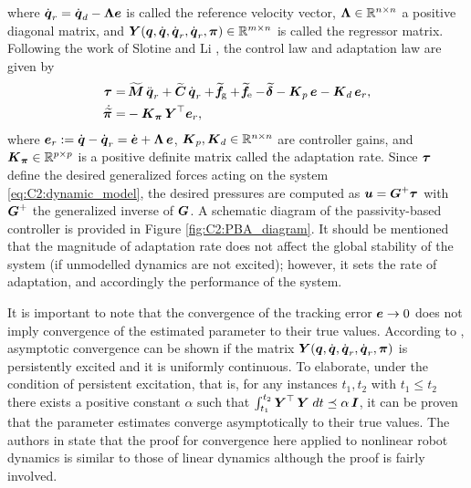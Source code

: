 \noindent where ${\dot{\boldsymbol{q}}}_r = {\dot{\boldsymbol{q}}}_d - \boldsymbol{\Lambda} {\boldsymbol{e}} $ is called the reference velocity vector, $\boldsymbol{\Lambda} \in \mathbb{R}^{n \times n}$ a positive diagonal matrix, and $\boldsymbol{Y}({\boldsymbol{q}},{\dot{\boldsymbol{q}}},{\dot{\boldsymbol{q}}}_r,{\dot{\boldsymbol{q}}}_r,\boldsymbol{\pi}) \in \mathbb{R}^{m\times n}$ is called the regressor matrix. Following the work of Slotine and Li \cite{Slotine1988}, the control law and adaptation law are given by
%
\begin{align}
\boldsymbol{\tau} = &\, \widetilde{\boldsymbol{M}}\,{\ddot{\boldsymbol{q}}}_r + \widetilde{\boldsymbol{C}}\, {\dot{\boldsymbol{q}}}_r + \widetilde{\!\boldsymbol{f}}\!_{\scriptstyle\textrm{g}} +  \widetilde{\!\boldsymbol{f}}\!_{\scriptstyle\textrm{e}} - \widetilde{\!\boldsymbol{\delta}} - \boldsymbol{K}_p \, \boldsymbol{e} - \boldsymbol{K}_d\, \boldsymbol{e}_r,  \label{eq:C2:tau} \\
\dot{\widetilde{\!\boldsymbol{\pi}}} =& - \boldsymbol{K}_{\boldsymbol{\pi}}\,\boldsymbol{Y}^\top\boldsymbol{e}_r,  \label{eq:C2:update}
\end{align}
%
where $\boldsymbol{e}_r := {\dot{\boldsymbol{q}}} - {\dot{\boldsymbol{q}}}_r = \dot{\boldsymbol{e}} + \boldsymbol{\Lambda}\,\boldsymbol{e}$, $\boldsymbol{K}_p, \boldsymbol{K}_d \in \mathbb{R}^{n\times n}$ are controller gains, and $\boldsymbol{K}_{\boldsymbol{\pi}} \in \mathbb{R}^{p\times p}$ is a positive definite matrix called the adaptation rate. Since $\boldsymbol{\tau}$ define the desired generalized forces acting on the system \eqref{eq:C2:dynamic_model}, the desired pressures are computed as ${\boldsymbol{u}} = \boldsymbol{G}^{+} \boldsymbol{\tau}$ with $\boldsymbol{G}^{+}$ the generalized inverse of $\boldsymbol{G}$. A schematic diagram of the passivity-based controller is provided in Figure \ref{fig:C2:PBA_diagram}. It should be mentioned that the magnitude of adaptation rate does not affect the global stability of the system (if unmodelled dynamics are not excited); however, it sets the rate of adaptation, and accordingly the performance of the system.

\begin{rmk}
\label{rmk:C2:poe}
 It is important to note that the convergence of the tracking error ${\boldsymbol{e}} \to 0$ does not imply convergence of the estimated parameter to their true values. According to \cite{Slotine1988,Slotine1989Jul,SlotineJ1987}, asymptotic convergence can be shown if the matrix $\boldsymbol{Y}({\boldsymbol{q}},{\dot{\boldsymbol{q}}},{\dot{\boldsymbol{q}}}_r,{\dot{\boldsymbol{q}}}_r,\boldsymbol{\pi})$ is persistently excited and it is uniformly continuous. To elaborate, under the condition of persistent excitation, that is, for any instances $t_1,t_2$ with  $t_1\le t_2$  there exists a positive constant $\alpha$ such that $\int_{t_1}^{t_2} \boldsymbol{Y}^\top\,\boldsymbol{Y} \;dt \preceq \alpha\,\boldsymbol{I}$, it can be proven that the parameter estimates converge asymptotically to their true values. The authors in \cite{Slotine1988} state that the proof for convergence here applied to nonlinear robot dynamics is similar to those of linear dynamics \cite{Morgan1977} although the proof is fairly involved. 
\end{rmk}
%
